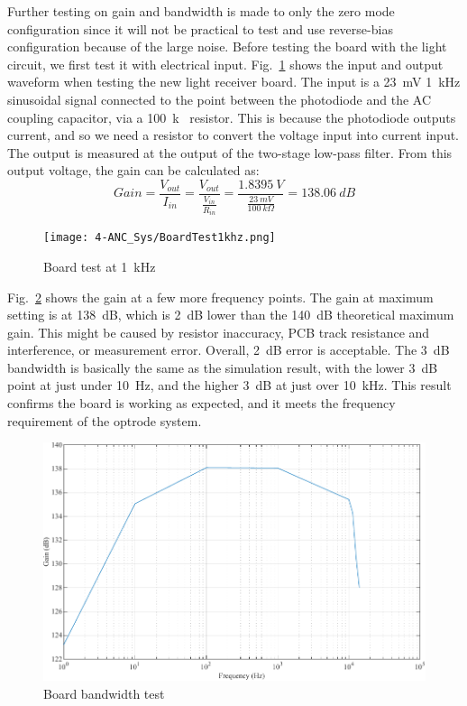 Further testing on gain and bandwidth is made to only the zero mode configuration since it will not be practical to test and use reverse-bias configuration because of the large noise.  Before testing the board with the light circuit, we first test it with electrical input.  Fig.~\ref{fig_BoardTest1khz} shows the input and output waveform when testing the new light receiver board.  The input is a \qty{23}{mV} \qty{1}{kHz} sinusoidal signal connected to the point between the photodiode and the AC coupling capacitor, via a \qty{100}{k\Omega} resistor.  This is because the photodiode outputs current, and so we need a resistor to convert the voltage input into current input.  The output is measured at the output of the two-stage low-pass filter.  From this output voltage, the gain can be calculated as:
$$Gain=\frac{V_{out}}{I_{in}}=\frac{V_{out}}{\frac{V_{in}}{R_{in}}}=\frac{\qty{1.8395}{V}}{\frac{\qty{23}{mV}}{\qty{100}{k\Omega}}}=\qty{138.06}{dB}$$

\begin{figure}[H]
\centering
\texttt{[image: 4-ANC\_Sys/BoardTest1khz.png]}
\caption{Board test at \qty{1}{kHz}}
\label{fig_BoardTest1khz}
\end{figure}

Fig.~\ref{fig_BoardBandwidth} shows the gain at a few more frequency points.  The gain at maximum setting is at \qty{138}{dB}, which is \qty{2}{dB} lower than the \qty{140}{dB} theoretical maximum gain.  This might be caused by resistor inaccuracy, PCB track resistance and interference, or measurement error.  Overall, \qty{2}{dB} error is acceptable.  The \qty{3}{dB} bandwidth is basically the same as the simulation result, with the lower \qty{3}{dB} point at just under \qty{10}{Hz}, and the higher \qty{3}{dB} at just over \qty{10}{kHz}.  This result confirms the board is working as expected, and it meets the frequency requirement of the optrode system.

\begin{figure}[H]
\centering
\includegraphics[width=1\linewidth]{4-ANC_Sys/BoardBandwidth.pdf}
\caption{Board bandwidth test}
\label{fig_BoardBandwidth}
\end{figure}




